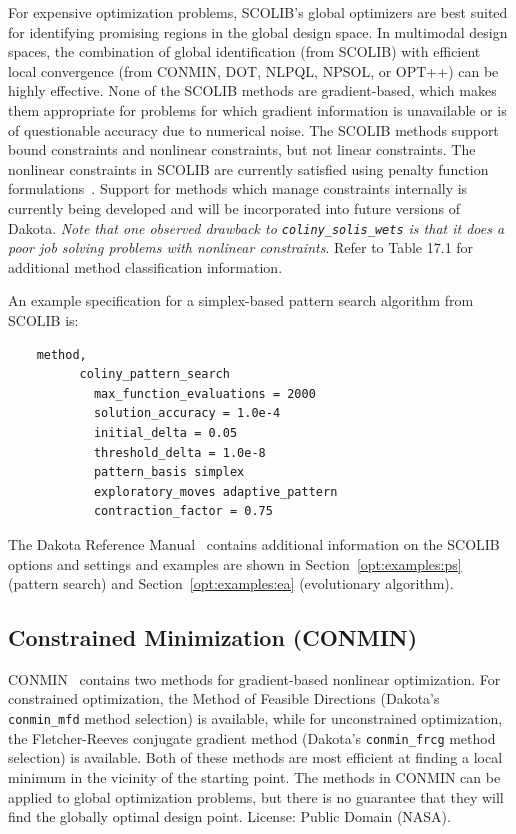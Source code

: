 For expensive optimization problems, SCOLIB's global optimizers are
best suited for identifying promising regions in the global design
space. In multimodal design spaces, the combination of global
identification (from SCOLIB) with efficient local convergence (from
CONMIN, DOT, NLPQL, NPSOL, or OPT++) can be highly effective. None of
the SCOLIB methods are gradient-based, which makes them appropriate
for problems for which gradient information is unavailable or is of
questionable accuracy due to numerical noise. The SCOLIB methods
support bound constraints and nonlinear constraints, but not linear
constraints. The nonlinear constraints in SCOLIB are currently
satisfied using penalty function formulations~\cite{Pon96}. Support
for methods which manage constraints internally is currently being
developed and will be incorporated into future versions of Dakota.
\emph{Note that one observed drawback to \texttt{coliny\_solis\_wets}
is that it does a poor job solving problems with nonlinear
constraints}. Refer to Table 17.1 for additional method
classification information.

An example specification for a simplex-based pattern search algorithm
from SCOLIB is:
\begin{small}
\begin{verbatim}
    method,
          coliny_pattern_search
            max_function_evaluations = 2000
            solution_accuracy = 1.0e-4
            initial_delta = 0.05
            threshold_delta = 1.0e-8
            pattern_basis simplex
            exploratory_moves adaptive_pattern
            contraction_factor = 0.75
\end{verbatim}
\end{small}

The Dakota Reference Manual~\cite{RefMan} contains additional information
on the SCOLIB options and settings and examples are shown in 
Section~\ref{opt:examples:ps} (pattern search) and
Section~\ref{opt:examples:ea} (evolutionary algorithm).

\subsection{Constrained Minimization (CONMIN)}\label{opt:software:conmin}

CONMIN~\cite{Van78} contains two methods for gradient-based nonlinear
optimization. For constrained optimization, the Method of Feasible
Directions (Dakota's \texttt{conmin\_mfd} method selection) is
available, while for unconstrained optimization, the Fletcher-Reeves
conjugate gradient method (Dakota's \texttt{conmin\_frcg} method
selection) is available. Both of these methods are most efficient at
finding a local minimum in the vicinity of the starting point. The
methods in CONMIN can be applied to global optimization problems, but
there is no guarantee that they will find the globally optimal design
point. License: Public Domain (NASA).

